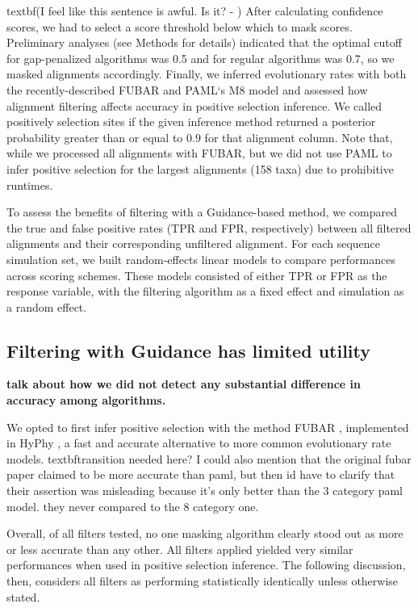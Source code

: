 \documentclass[10pt]{article}
\begin{document}
textbf{(I feel like this sentence is awful. Is it? - ) After calculating confidence scores, we had to select a score threshold below which to mask scores.} Preliminary analyses (see Methods for details) indicated that the optimal cutoff for gap-penalized algorithms was 0.5 and for regular algorithms was 0.7, so we masked alignments accordingly. Finally, we inferred evolutionary rates with both the recently-described FUBAR \citep{Murrell2013} and PAML`s M8 model \citep{Yang2007} and assessed how alignment filtering affects accuracy in positive selection inference. We called positively selection sites if the given inference method returned a posterior probability greater than or equal to $0.9$ for that alignment column. Note that, while we processed all alignments with FUBAR, but we did not use PAML to infer positive selection for the largest alignments (158 taxa) due to prohibitive runtimes. 

To assess the benefits of filtering with a Guidance-based method, we compared the true and false positive rates (TPR and FPR, respectively) between all filtered alignments and their corresponding unfiltered alignment. For each sequence simulation set, we built random-effects linear models to compare performances across scoring schemes. These models consisted of either TPR or FPR as the response variable, with the filtering algorithm as a fixed effect and simulation as a random effect. 


\subsection*{Filtering with Guidance has limited utility}
\textbf{talk about how we did not detect any substantial difference in accuracy among algorithms.}

We opted to first infer positive selection with the method FUBAR \citep{Murrell2013}, implemented in HyPhy \citep{Pond2005}, a fast and accurate alternative to more common evolutionary rate models. textbf{transition needed here? I could also mention that the original fubar paper claimed to be more accurate than paml, but then id have to clarify that their assertion was misleading because it's only better than the 3 category paml model. they never compared to the 8 category one.} 

Overall, of all filters tested, no one masking algorithm clearly stood out as more or less accurate than any other. All filters applied yielded very similar performances when used in positive selection inference. The following discussion, then, considers all filters as performing statistically identically unless otherwise stated.
\end{document}
